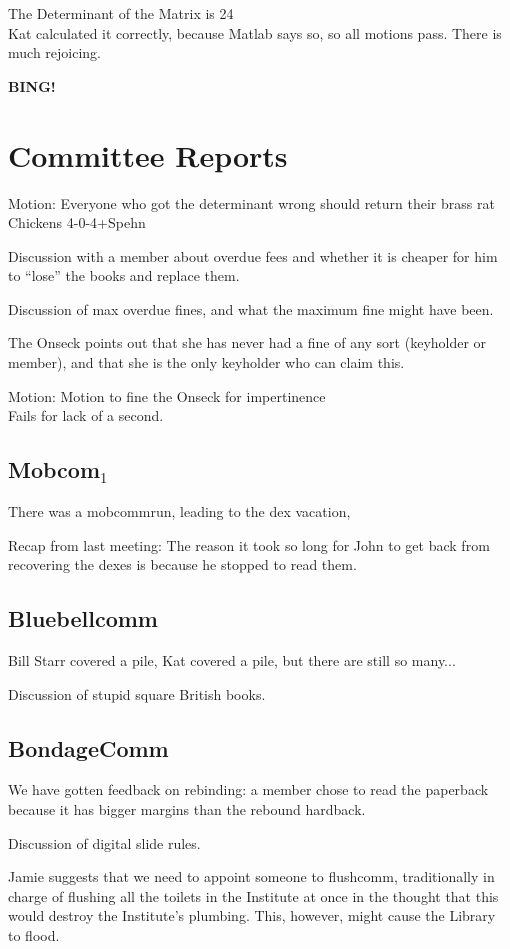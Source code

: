 \documentclass[10pt]{article}
\newcommand{\bing}{{\bf BING!} }
\begin{document}
The Determinant of the Matrix is  24\\
Kat calculated it correctly, because Matlab says so, so all motions
pass. There is much rejoicing.

\bing

\section*{Committee Reports}

Motion: Everyone who got the determinant wrong should return their
brass rat\\
Chickens 4-0-4+Spehn

Discussion with a member about overdue fees and whether it is cheaper
for him to ``lose'' the books and replace them.

Discussion of max overdue fines, and what the maximum fine might have been.

The Onseck points out that she has never had a fine of any sort
(keyholder or member), and that she is the only keyholder who can
claim this. 

Motion: Motion to fine the Onseck for impertinence\\
Fails for lack of a second.

\subsection*{Mobcom$_1$}
There was a mobcommrun, leading to the dex vacation, 

Recap from last meeting: The reason it took so long for John to get
back from recovering the dexes is because he stopped to read them.

\subsection*{Bluebellcomm}
Bill Starr covered a pile, Kat covered a pile, but there are still so many...

Discussion of stupid square British books.

\subsection*{BondageComm}
We have gotten feedback on rebinding: a member chose to read the paperback because it
has bigger margins than the rebound hardback.

Discussion of digital slide rules.

Jamie suggests that we need to appoint someone to flushcomm,
traditionally in charge of flushing all the toilets in the Institute
at once in the thought that this would destroy the Institute's
plumbing. This, however, might cause the Library to flood.
\end{document}
